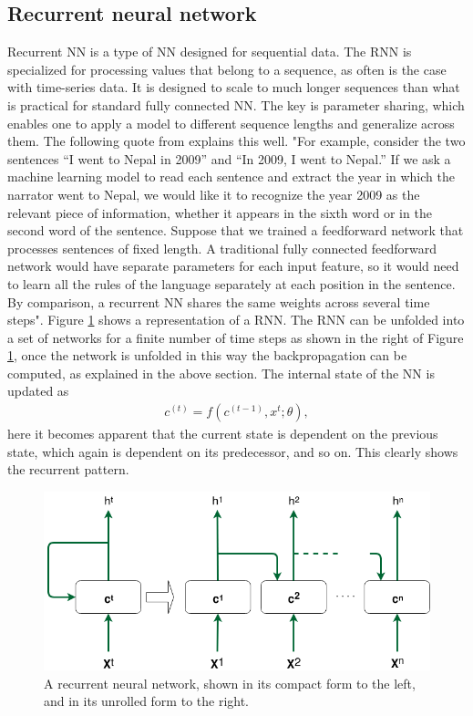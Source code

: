     
    \subsection{Recurrent neural network}\label{subsubsec:RNN}
        Recurrent NN is a type of NN designed for sequential data. The RNN is specialized for processing values that belong to a sequence, as often is the case with time-series data. It is designed to scale to much longer sequences than what is practical for standard fully connected NN. The key is parameter sharing, which enables one to apply a model to different sequence lengths and generalize across them. The following quote from \cite{Goodfellow-et-al-2016} explains this well. "For example, consider the two sentences “I went to Nepal in 2009” and “In 2009, I went to Nepal.” If we ask a machine learning model to read each sentence and extract the year in which the narrator went to Nepal, we would like it to recognize the year 2009 as the relevant piece of information, whether it appears in the sixth word or in the second word of the sentence. Suppose that we trained a feedforward network that processes sentences of fixed length. A traditional fully connected feedforward network would have separate parameters for each input feature, so it would need to learn all the rules of the language separately at each position in the sentence. By comparison, a recurrent NN shares the same weights across several time steps". Figure \ref{fig:RNN} shows a representation of a RNN. The RNN can be unfolded into a set of networks for a finite number of time steps as shown in the right of Figure \ref{fig:RNN}, once the network is unfolded in this way the backpropagation can be computed, as explained in the above section. The internal state of the NN is updated as
        \begin{align}
            c^{(t)} = f(c^{(t-1)},x^t;\theta), 
            \label{eq:RNN}
        \end{align}
        here it becomes apparent that the current state is dependent on the previous state, which again is dependent on its predecessor, and so on. This clearly shows the recurrent pattern. 
        
        
        \begin{figure}
            \centering
            \includegraphics[width=\textwidth]{report/figures/techniques/RNN.png}
            \caption{A recurrent neural network, shown in its compact form to the left, and in its unrolled form to the right.}
            \label{fig:RNN}
        \end{figure}
    
